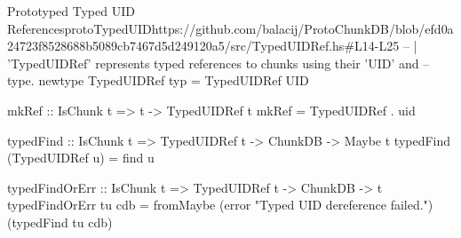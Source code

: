 \begin{haskell}{Prototyped Typed UID References}{protoTypedUID}{https://github.com/balacij/ProtoChunkDB/blob/efd0a24723f8528688b5089cb7467d5d249120a5/src/TypedUIDRef.hs\#L14-L25}
-- | 'TypedUIDRef' represents typed references to chunks using their 'UID' and
-- type.
newtype TypedUIDRef typ = TypedUIDRef UID

mkRef :: IsChunk t => t -> TypedUIDRef t
mkRef = TypedUIDRef . uid

typedFind :: IsChunk t => TypedUIDRef t -> ChunkDB -> Maybe t
typedFind (TypedUIDRef u) = find u

typedFindOrErr :: IsChunk t => TypedUIDRef t -> ChunkDB -> t
typedFindOrErr tu cdb = fromMaybe (error "Typed UID dereference failed.") (typedFind tu cdb)
\end{haskell}

